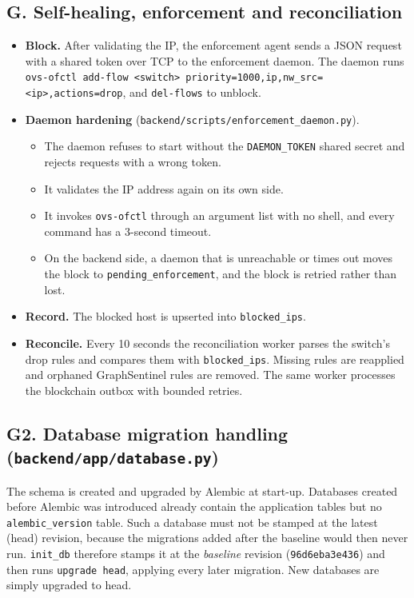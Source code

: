 \documentclass[12pt,a4paper]{report}
\begin{document}
\subsection*{G. Self-healing, enforcement and reconciliation}
\begin{itemize}
    \item \textbf{Block.} After validating the IP, the enforcement agent sends a JSON request with a shared token over TCP to the enforcement daemon. The daemon runs \texttt{ovs-ofctl add-flow <switch> priority=1000,ip,nw\_\allowbreak{}src=<ip>,actions=drop}, and \texttt{del-flows} to unblock.
    \item \textbf{Daemon hardening} (\texttt{backend/\allowbreak{}scripts/\allowbreak{}enforcement\_\allowbreak{}daemon.\allowbreak{}py}).
    \begin{itemize}
        \item The daemon refuses to start without the \texttt{DAEMON\_TOKEN} shared secret and rejects requests with a wrong token.
        \item It validates the IP address again on its own side.
        \item It invokes \texttt{ovs-ofctl} through an argument list with no shell, and every command has a 3-second timeout.
        \item On the backend side, a daemon that is unreachable or times out moves the block to \texttt{pending\_enforcement}, and the block is retried rather than lost.
    \end{itemize}
    \item \textbf{Record.} The blocked host is upserted into \texttt{blocked\_ips}.
    \item \textbf{Reconcile.} Every 10 seconds the reconciliation worker parses the switch's drop rules and compares them with \texttt{blocked\_ips}. Missing rules are reapplied and orphaned GraphSentinel rules are removed. The same worker processes the blockchain outbox with bounded retries.
\end{itemize}

\subsection*{G2. Database migration handling (\texttt{backend/app/database.py})}
The schema is created and upgraded by Alembic at start-up. Databases created before Alembic was introduced already contain the application tables but no \texttt{alembic\_version} table. Such a database must not be stamped at the latest (head) revision, because the migrations added after the baseline would then never run. \texttt{init\_db} therefore stamps it at the \emph{baseline} revision (\texttt{96d6eba3e436}) and then runs \texttt{upgrade head}, applying every later migration. New databases are simply upgraded to head.
\end{document}
